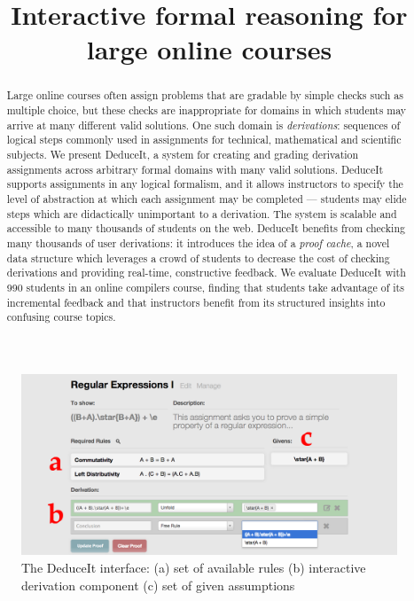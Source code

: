 \documentclass{sigchi}
\begin{document}
\title{Interactive formal reasoning for large online courses}


\maketitle

\begin{figure}[ht!]
\centering
\includegraphics[width=1\textwidth]{splash3}
\caption{The DeduceIt interface: (a) set of available rules (b) interactive derivation component (c) set of given assumptions}
\label{fig:splash}
\end{figure}

\begin{abstract}
Large online courses often assign problems that are gradable by simple checks such as multiple choice, but these checks are inappropriate for domains in which students may arrive at many different valid solutions. One such domain is \emph{derivations}: sequences of logical steps commonly used in assignments for technical, mathematical and scientific subjects. We present DeduceIt, a system for creating and grading derivation assignments across arbitrary formal domains with many valid solutions. DeduceIt supports assignments in any logical formalism, and it allows instructors to specify the level of abstraction at which each assignment may be completed --- students may elide steps which are didactically unimportant to a derivation. The system is scalable and accessible to many thousands of students on the web. DeduceIt benefits from checking many thousands of user derivations: it introduces the idea of a \textit{proof cache}, a novel data structure which leverages a crowd of students to decrease the cost of checking derivations and providing real-time, constructive feedback. We evaluate DeduceIt with 990 students in an online compilers course, finding that students take advantage of its incremental feedback and that instructors benefit from its structured insights into confusing course topics.
\end{abstract}
\end{document}
